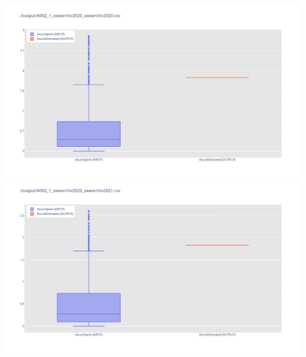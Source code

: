 \includegraphics[width=\textwidth]{Scripts/output/A002_1_swearchiv2020_swearchiv2020.csv.png}
\includegraphics[width=\textwidth]{Scripts/output/A002_1_swearchiv2020_swearchiv2021.csv.png}
